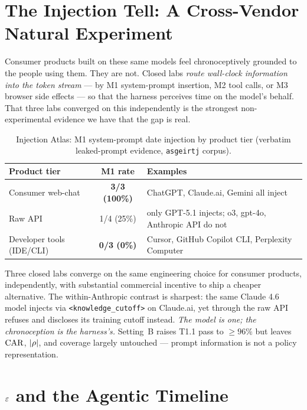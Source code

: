 \documentclass{article}
\begin{document}
\section{The Injection Tell: A Cross-Vendor Natural Experiment}\label{sec:injection}

Consumer products built on these same models feel chronoceptively grounded to the people using them. They are not. Closed labs \emph{route wall-clock information into the token stream} --- by M1 system-prompt insertion, M2 tool calls, or M3 browser side effects --- so that the harness perceives time on the model's behalf. That three labs converged on this independently is the strongest non-experimental evidence we have that the gap is real.

\begin{table}[h]
\centering\small
\caption{Injection Atlas: M1 system-prompt date injection by product tier (verbatim leaked-prompt evidence, \texttt{asgeirtj} corpus).}
\label{tab:atlas}
\begin{tabular}{@{}lcp{6.5cm}@{}}
\toprule
Product tier & M1 rate & Examples \\
\midrule
Consumer web-chat & \textbf{3/3 (100\%)} & ChatGPT, Claude.ai, Gemini all inject \\
Raw API & 1/4 (25\%) & only GPT-5.1 injects; o3, gpt-4o, Anthropic API do not \\
Developer tools (IDE/CLI) & \textbf{0/3 (0\%)} & Cursor, GitHub Copilot CLI, Perplexity Computer \\
\bottomrule
\end{tabular}
\end{table}

Three closed labs converge on the same engineering choice for consumer products, independently, with substantial commercial incentive to ship a cheaper alternative. The within-Anthropic contrast is sharpest: the same Claude 4.6 model injects via \texttt{<knowledge\_cutoff>} on Claude.ai, yet through the raw API refuses and discloses its training cutoff instead. \emph{The model is one; the chronoception is the harness's.} Setting~B raises T1.1 pass to $\geq 96\%$ but leaves $\mathrm{CAR}$, $|\rho|$, and coverage largely untouched --- prompt information is not a policy representation.

\section{$\varepsilon$ and the Agentic Timeline}\label{sec:timeline}
\end{document}
